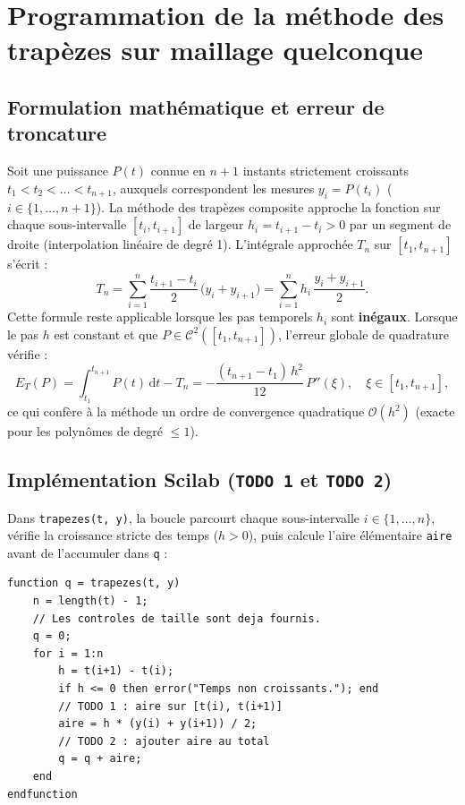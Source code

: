 \documentclass[10pt,a4paper]{article}
\begin{document}
\section{Programmation de la méthode des trapèzes sur maillage quelconque}

\subsection{Formulation mathématique et erreur de troncature}
Soit une puissance $P(t)$ connue en $n+1$ instants strictement croissants $t_1 < t_2 < \dots < t_{n+1}$, auxquels correspondent les mesures $y_i = P(t_i)$ ($i \in \{1, \dots, n+1\}$). La méthode des trapèzes composite approche la fonction sur chaque sous-intervalle $[t_i, t_{i+1}]$ de largeur $h_i = t_{i+1} - t_i > 0$ par un segment de droite (interpolation linéaire de degré 1). L'intégrale approchée $T_n$ sur $[t_1, t_{n+1}]$ s'écrit :
\begin{equation}
    T_n = \sum_{i=1}^{n} \frac{t_{i+1} - t_i}{2}\,\bigl(y_i + y_{i+1}\bigr) = \sum_{i=1}^{n} h_i\,\frac{y_i + y_{i+1}}{2}.
    \label{eq:trapezes}
\end{equation}
Cette formule reste applicable lorsque les pas temporels $h_i$ sont \textbf{inégaux}. Lorsque le pas $h$ est constant et que $P \in \mathcal{C}^2([t_1, t_{n+1}])$, l'erreur globale de quadrature vérifie :
\begin{equation}
    E_T(P) = \int_{t_1}^{t_{n+1}} P(t)\,\mathrm{d}t - T_n = -\frac{(t_{n+1} - t_1)\,h^2}{12}\,P''(\xi), \quad \xi \in [t_1, t_{n+1}],
    \label{eq:err_trap}
\end{equation}
ce qui confère à la méthode un ordre de convergence quadratique $\mathcal{O}(h^2)$ (exacte pour les polynômes de degré $\le 1$).

\subsection{Implémentation Scilab (\texttt{TODO 1} et \texttt{TODO 2})}
Dans \texttt{trapezes(t, y)}, la boucle parcourt chaque sous-intervalle $i \in \{1, \dots, n\}$, vérifie la croissance stricte des temps ($h > 0$), puis calcule l'aire élémentaire \texttt{aire} avant de l'accumuler dans \texttt{q} :

\noindent\begin{minipage}{\textwidth}
\begin{lstlisting}[caption={Implémentation complète de la fonction \texttt{trapezes(t, y)} sous Scilab.}]
function q = trapezes(t, y)
    n = length(t) - 1;
    // Les controles de taille sont deja fournis.
    q = 0;
    for i = 1:n
        h = t(i+1) - t(i);
        if h <= 0 then error("Temps non croissants."); end
        // TODO 1 : aire sur [t(i), t(i+1)]
        aire = h * (y(i) + y(i+1)) / 2;
        // TODO 2 : ajouter aire au total
        q = q + aire;
    end
endfunction
\end{lstlisting}
\end{minipage}
\end{document}
